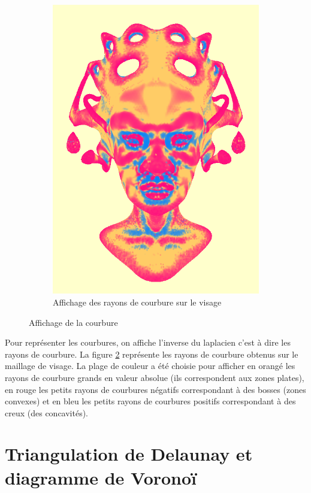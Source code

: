 \documentclass[12pt,a4paper,twoside]{report}
\begin{document}
\begin{figure}[H]
\begin{subfigure}{.4\textwidth}
		\includegraphics[width=\textwidth]{courbure_queen.png}
		\caption{Affichage des rayons de courbure sur le visage}					
		\label{fig:courbure_queen}
	\end{subfigure}
	\caption{Affichage de la courbure}
\end{figure}

Pour représenter les courbures, on affiche l'inverse du laplacien c'est à dire les rayons de courbure. La figure \ref{fig:courbure_queen} représente les rayons de courbure obtenus sur le maillage de visage. La plage de couleur a été choisie pour afficher en orangé les rayons de courbure grands en valeur absolue (ils correspondent aux zones plates), en rouge les petits rayons de courbures négatifs correspondant à des bosses (zones convexes) et en bleu les petits rayons de courbures positifs correspondant à des creux (des concavités).

\newpage\section{Triangulation de Delaunay et diagramme de Voronoï}
\end{document}
